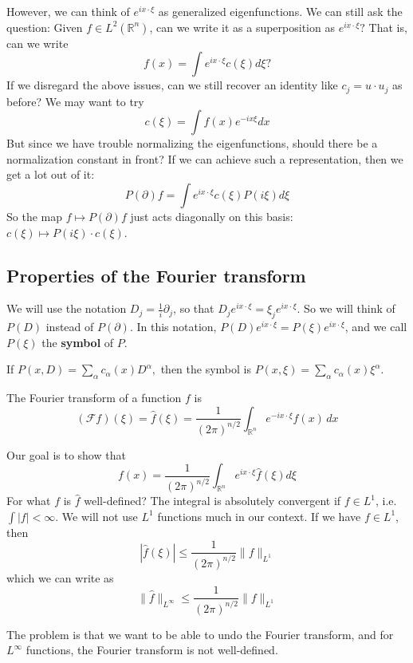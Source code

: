 However, we can think of $e^{i x \cdot \xi}$ as generalized eigenfunctions. We can still ask the question: Given $f \in L^{2}\left(\mathbb{R}^{n}\right)$, can we write it as a superposition as $e^{i x \cdot \xi} ?$ That is, can we write
$$
f(x)=\int e^{i x \cdot \xi} c(\xi) d \xi ?
$$
If we disregard the above issues, can we still recover an identity like $c_{j}=u \cdot u_{j}$ as before? We may want to try
$$
c(\xi)=\int f(x) e^{-i x \xi} d x
$$
But since we have trouble normalizing the eigenfunctions, should there be a normalization constant in front?
If we can achieve such a representation, then we get a lot out of it:
$$
P(\partial) f=\int e^{i x \cdot \xi} c(\xi) P(i \xi) d \xi
$$
So the map $f \mapsto P(\partial) f$ just acts diagonally on this basis: $c(\xi) \mapsto P(i \xi) \cdot c(\xi)$.

\subsection{Properties of the Fourier transform}
We will use the notation $D_{j}=\frac{1}{i} \partial_{j}$, so that $D_{j} e^{i x \cdot \xi}=\xi_{j} e^{i x \cdot \xi}$. So we will think of $P(D)$ instead of $P(\partial)$. In this notation, $P(D) e^{i x \cdot \xi}=P(\xi) e^{i x \cdot \xi}$, and we call $P(\xi)$ the \textbf{symbol} of $P$.

\begin{example}
 If $P(x, D)=\sum_{\alpha} c_{\alpha}(x) D^{\alpha}, $ then the symbol is $ P(x, \xi)=\sum_{\alpha} c_{\alpha}(x) \xi^{\alpha}$.
\end{example}

\begin{definition}
 The Fourier transform of a function $f$ is 
\[
    (\mathcal{F} f)(\xi)=\widehat{f}(\xi)=\frac{1}{(2 \pi)^{n / 2}} \int_{\mathbb{R}^{n}} e^{-i x \cdot \xi} f(x) \, d x
\]
\end{definition}
Our goal is to show that
$$
f(x)=\frac{1}{(2 \pi)^{n / 2}} \int_{\mathbb{R}^{n}} e^{i x \cdot \xi} \widehat{f}(\xi) d \xi
$$
For what $f$ is $\widehat{f}$ well-defined? The integral is absolutely convergent if $f \in L^{1}$, i.e. $\int|f|<\infty .$ We will not use $L^{1}$ functions much in our context. If we have $f \in L^{1}$, then
$$
|\widehat{f}(\xi)| \leq \frac{1}{(2 \pi)^{n / 2}}\|f\|_{L^{1}}
$$
which we can write as
$$
\|\widehat{f}\|_{L^{\infty}} \leq \frac{1}{(2 \pi)^{n / 2}}\|f\|_{L^{1}}
$$

The problem is that we want to be able to undo the Fourier transform, and for $L^{\infty}$ functions, the Fourier transform is not well-defined.

